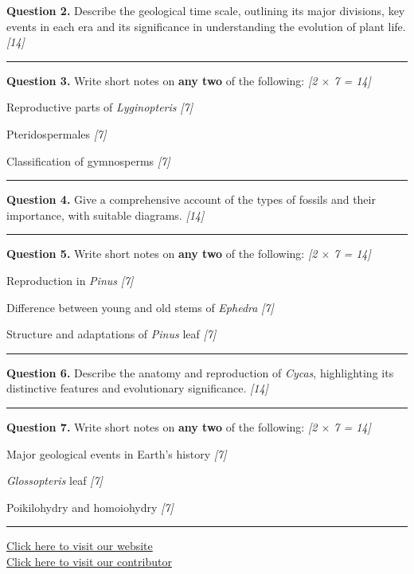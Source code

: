 \documentclass[11pt,a4paper]{article}
\newcommand{\pts}[1]{\hfill \textit{[#1]}}
\begin{document}
\noindent \textbf{Question 2.} Describe the geological time scale, outlining its major divisions, key events in each era and its significance in understanding the evolution of plant life. \pts{14}

\medskip\rule{\linewidth}{0.2pt}\medskip

\noindent \textbf{Question 3.} Write short notes on \textbf{any two} of the following: \pts{2 $\times$ 7 = 14}
\begin{parts}
  \item Reproductive parts of \textit{Lyginopteris} \pts{7}
  \item Pteridospermales \pts{7}
  \item Classification of gymnosperms \pts{7}
\end{parts}

\medskip\rule{\linewidth}{0.2pt}\medskip

\noindent \textbf{Question 4.} Give a comprehensive account of the types of fossils and their importance, with suitable diagrams. \pts{14}

\medskip\rule{\linewidth}{0.2pt}\medskip

\noindent \textbf{Question 5.} Write short notes on \textbf{any two} of the following: \pts{2 $\times$ 7 = 14}
\begin{parts}
  \item Reproduction in \textit{Pinus} \pts{7}
  \item Difference between young and old stems of \textit{Ephedra} \pts{7}
  \item Structure and adaptations of \textit{Pinus} leaf \pts{7}
\end{parts}

\medskip\rule{\linewidth}{0.2pt}\medskip

\noindent \textbf{Question 6.} Describe the anatomy and reproduction of \textit{Cycas}, highlighting its distinctive features and evolutionary significance. \pts{14}

\medskip\rule{\linewidth}{0.2pt}\medskip

\noindent \textbf{Question 7.} Write short notes on \textbf{any two} of the following: \pts{2 $\times$ 7 = 14}
\begin{parts}
  \item Major geological events in Earth's history \pts{7}
  \item \textit{Glossopteris} leaf \pts{7}
  \item Poikilohydry and homoiohydry \pts{7}
\end{parts}

\vfill
\rule{\linewidth}{0.4pt}

\begin{center}\small
\href{https://bhu-exam.vercel.app/}{Click here to visit our website}\\[4pt]
\href{https://me-aryan.vercel.app/}{Click here to visit our contributor}
\end{center}
\end{document}
